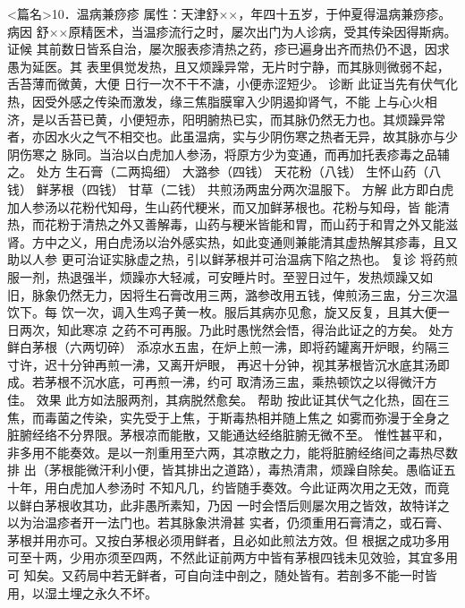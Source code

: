 \documentclass[a4paper,12pt,UTF8,twoside]{ctexbook}
\begin{document}
<篇名>10．温病兼痧疹
属性：天津舒××，年四十五岁，于仲夏得温病兼痧疹。 
病因 舒××原精医术，当温疹流行之时，屡次出门为人诊病，受其传染因得斯病。 
证候 其前数日皆系自治，屡次服表疹清热之药，疹已遍身出齐而热仍不退，因求愚为延医。其 
表里俱觉发热，且又烦躁异常，无片时宁静，而其脉则微弱不起，舌苔薄而微黄，大便 
日行一次不干不溏，小便赤涩短少。 
诊断 此证当先有伏气化热，因受外感之传染而激发，缘三焦脂膜窜入少阴遏抑肾气，不能 
上与心火相济，是以舌苔已黄，小便短赤，阳明腑热已实，而其脉仍然无力也。其烦躁异常 
者，亦因水火之气不相交也。此虽温病，实与少阴伤寒之热者无异，故其脉亦与少阴伤寒之 
脉同。当治以白虎加人参汤，将原方少为变通，而再加托表疹毒之品辅之。 
处方 生石膏（二两捣细） 大潞参（四钱） 天花粉（八钱） 生怀山药（八钱） 
鲜茅根（四钱） 甘草（二钱） 
共煎汤两盅分两次温服下。 
方解 此方即白虎加人参汤以花粉代知母，生山药代粳米，而又加鲜茅根也。花粉与知母，皆 
能清热，而花粉于清热之外又善解毒，山药与粳米皆能和胃，而山药于和胃之外又能滋 
肾。方中之义，用白虎汤以治外感实热，如此变通则兼能清其虚热解其疹毒，且又助以人参 
更可治证实脉虚之热，引以鲜茅根并可治温病下陷之热也。 
复诊 将药煎服一剂，热退强半，烦躁亦大轻减，可安睡片时。至翌日过午，发热烦躁又如 
旧，脉象仍然无力，因将生石膏改用三两，潞参改用五钱，俾煎汤三盅，分三次温饮下。每 
饮一次，调入生鸡子黄一枚。服后其病亦见愈，旋又反复，且其大便一日两次，知此寒凉 
之药不可再服。乃此时愚恍然会悟，得治此证之的方矣。 
处方 鲜白茅根（六两切碎） 
添凉水五盅，在炉上煎一沸，即将药罐离开炉眼，约隔三寸许，迟十分钟再煎一沸，又离开炉眼， 
再迟十分钟，视其茅根皆沉水底其汤即成。若茅根不沉水底，可再煎一沸，约可 
取清汤三盅，乘热顿饮之以得微汗方佳。 
效果 此方如法服两剂，其病脱然愈矣。 
帮助 按此证其伏气之化热，固在三焦，而毒菌之传染，实先受于上焦，于斯毒热相并随上焦之 
如雾而弥漫于全身之脏腑经络不分界限。茅根凉而能散，又能通达经络脏腑无微不至。 
惟性甚平和，非多用不能奏效。是以一剂重用至六两，其凉散之力，能将脏腑经络间之毒热尽数排 
出（茅根能微汗利小便，皆其排出之道路），毒热清肃，烦躁自除矣。愚临证五十年，用白虎加人参汤时 
不知凡几，约皆随手奏效。今此证两次用之无效，而竟以鲜白茅根收其功，此非愚所素知，乃因 
一时会悟后则屡次用之皆效，故特详之以为治温疹者开一法门也。若其脉象洪滑甚 
实者，仍须重用石膏清之，或石膏、茅根并用亦可。又按白茅根必须用鲜者，且必如此煎法方效。但 
根据之成功多用可至十两，少用亦须至四两，不然此证前两方中皆有茅根四钱未见效验，其宜多用可 
知矣。又药局中若无鲜者，可自向洼中剖之，随处皆有。若剖多不能一时皆用，以湿土埋之永久不坏。 
\end{document}
